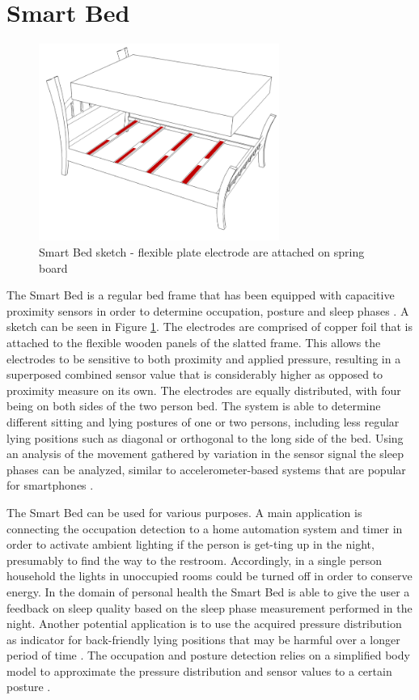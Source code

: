 \section{Smart Bed}
\begin{figure}[h]
\centering
\includegraphics[width=0.7\textwidth]{images/smartbed}
\caption{Smart Bed sketch - flexible plate electrode are attached on spring board}
\label{fig:smartbed_sketch}
\end{figure}
The Smart Bed is a regular bed frame that has been equipped with capacitive proximity sensors in order to determine occupation, posture and sleep phases \cite{braun2012context}\cite{Djakow2013movibed}. A sketch can be seen in Figure \ref{fig:smartbed_sketch}.  The electrodes are comprised of copper foil that is attached to the flexible wooden panels of the slatted frame. This allows the electrodes to be sensitive to both proximity and applied pressure, resulting in a superposed combined sensor value that is considerably higher as opposed to proximity measure on its own. The electrodes are equally distributed, with four being on both sides of the two person bed. The system is able to determine different sitting and lying postures of one or two persons, including less regular lying positions such as diagonal or orthogonal to the long side of the bed. Using an analysis of the movement gathered by variation in the sensor signal the sleep phases can be analyzed, similar to accelerometer-based systems that are popular for smartphones \cite{krejcar2011}.

The Smart Bed can be used for various purposes. A main application is connecting the occupation detection to a home automation system and timer in order to activate ambient lighting if the person is get-ting up in the night, presumably to find the way to the restroom. Accordingly, in a single person household the lights in unoccupied rooms could be turned off in order to conserve energy. In the domain of personal health the Smart Bed is able to give the user a feedback on sleep quality based on the sleep phase measurement performed in the night. Another potential application is to use the acquired pressure distribution as indicator for back-friendly lying positions that may be harmful over a longer period of time \cite{Hamisu2010}.
The occupation and posture detection relies on a simplified body model to approximate the pressure distribution and sensor values to a certain posture \cite{braun2012context}.  
